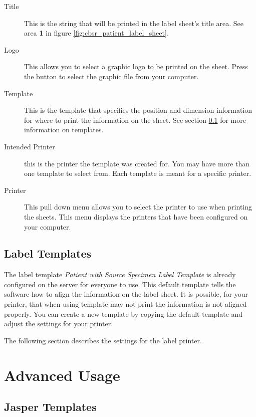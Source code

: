 \begin{description}
\item[Title] This is the string that will be printed in the label sheet's title
  area. See area \textbf{1} in figure \ref{fig:cbsr_patient_label_sheet}.
\item[Logo] This allows you to select a graphic logo to be printed on the
  sheet. Press the  button to select the graphic file from your
  computer.
\item[Template] This is the template that specifies the position and dimension information for where to
 print the information on the sheet. See section \ref{sec:label_templates} for
 more information  on templates.
\item[Intended Printer] this is the printer the template was created for. You
  may have more than one template to select from. Each template is meant for a
  specific printer.
\item[Printer] This pull down menu allows you to select the printer to use when
  printing the sheets. This menu displays the printers that have been
  configured on your computer.
\end{description}

\subsection{Label Templates}
\label{sec:label_templates}

The label template \emph{Patient with Source Specimen Label Template} is
already configured on the server for everyone to use. This default template
tells the software how to align the information on the label sheet.  It is
possible, for your printer, that when using template may not print the
information is not aligned properly. You can create a new template by copying
the default template and adjust the settings for your printer.

The following section describes the settings for the label printer.

\section{Advanced Usage}

\subsection{Jasper Templates}

